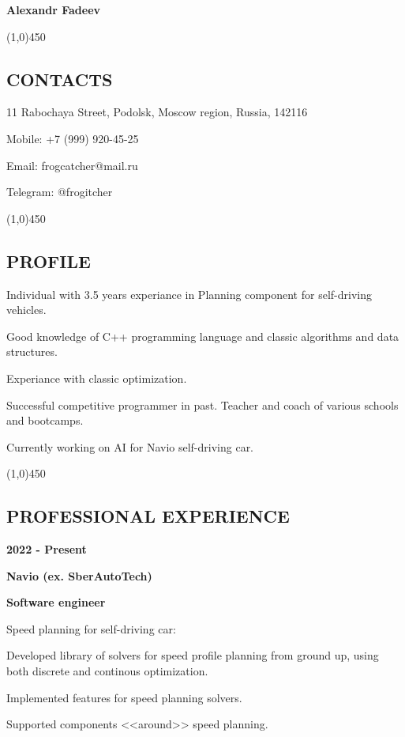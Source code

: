\documentclass[a4paper,12pt,preview]{report}
\newcommand{\hr}{\begin{center} \line(1,0){450} \end{center}}
\begin{document}
\begin{center}
    \Huge \textbf{Alexandr Fadeev}
\end{center}

\hr

\subsection*{CONTACTS}

11 Rabochaya Street, Podolsk, Moscow region, Russia, 142116

Mobile: +7 (999) 920-45-25

Email: frogcatcher@mail.ru

Telegram: @frogitcher

\hr

\subsection*{PROFILE}

Individual with 3.5 years experiance in Planning component for self-driving vehicles. 

Good knowledge of C++ programming language and classic algorithms and data structures. 

Experiance with classic optimization.

Successful competitive programmer in past. Teacher and coach of various schools and bootcamps.

Currently working on AI for Navio self-driving car.

\hr

 
\subsection*{PROFESSIONAL EXPERIENCE}

\begin{multicols}{2}
    \textbf{2022 - Present} 

    \columnbreak

    \textbf{Navio (ex. SberAutoTech)}

    \textbf{Software engineer}
\end{multicols}

\begin{minipage}[c]{0.30\linewidth}
    Speed planning for self-driving car:
\end{minipage}
\hfill
\begin{minipage}[c]{0.60\linewidth}
	Developed library of solvers for speed profile planning from ground up, using both discrete and continous optimization.
	
	Implemented features for speed planning solvers.
	
	Supported components <<around>> speed planning. 
\end{minipage}
\end{document}
